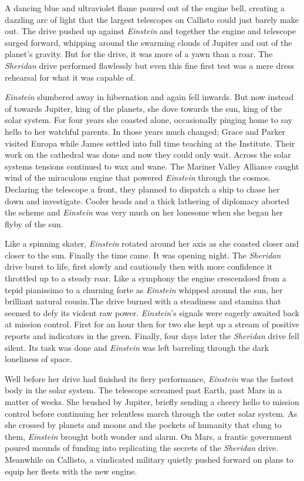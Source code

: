 \documentclass[12pt]{article} %
\begin{document}
A dancing blue and ultraviolet flame poured out of the engine bell, creating a dazzling arc of light that the largest telescopes on Callisto could just barely make out. The drive pushed up against \textit{Einstein} and together the engine and telescope surged forward, whipping around the swarming clouds of Jupiter and out of the planet's gravity. But for the drive, it was more of a yawn than a roar. The \textit{Sheridan} drive performed flawlessly but even this fine first test was a mere dress rehearsal for what it was capable of.

\textit{Einstein} slumbered away in hibernation and again fell inwards. But now instead of towards Jupiter, king of the planets, she dove towards the sun, king of the solar system. For four years she coasted alone, occasionally pinging home to say hello to her watchful parents. In those years much changed; Grace and Parker visited Europa while James settled into full time teaching at the Institute. Their work on the cathedral was done and now they could only wait. Across the solar systems tensions continued to wax and wane. The Mariner Valley Alliance caught wind of the miraculous engine that powered \textit{Einstein} through the cosmos. Declaring the telescope a front, they planned to dispatch a ship to chase her down and investigate. Cooler heads and a thick lathering of diplomacy aborted the scheme and \textit{Einstein} was very much on her lonesome when she began her flyby of the sun.

Like a spinning skater, \textit{Einstein} rotated around her axis as she coasted closer and closer to the sun. Finally the time came. It was opening night. The \textit{Sheridan} drive burst to life, first slowly and cautiously then with more confidence it throttled up to a steady roar. Like a symphony the engine crescendoed from a tepid pianissimo to a churning forte as \textit{Einstein} whipped around the sun, her brilliant natural cousin.The drive burned with a steadiness and stamina that seemed to defy its violent raw power. \textit{Einstein}'s signals were eagerly awaited back at mission control. First for an hour then for two she kept up a stream of positive reports and indicators in the green. Finally, four days later the \textit{Sheridan} drive fell silent. Its task was done and \textit{Einstein} was left barreling through the dark loneliness of space.

Well before her drive had finished its fiery performance, \textit{Einstein} was the fastest body in the solar system. The telescope screamed past Earth, past Mars in a matter of weeks. She brushed by Jupiter, briefly sending a cheery hello to mission control before continuing her relentless march through the outer solar system. As she crossed by planets and moons and the pockets of humanity that clung to them, \textit{Einstein} brought both wonder and alarm. On Mars, a frantic government poured mounds of funding into replicating the secrets of the \textit{Sheridan} drive. Meanwhile on Callisto, a vindicated military quietly pushed forward on plans to equip her fleets with the new engine.
\end{document}
